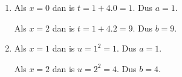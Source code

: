 \documentclass{article}
\begin{document}
\begin{enumerate}
\item
Als $x=0$ dan is $t=1+4.0=1$. Dus $a=1$.

\noindent Als $x=2$ dan is $t=1+4.2=9$. Dus $b=9$.

\item
Als $x=1$ dan is $u=1^2=1$. Dus $a=1$.

\noindent Als $x=2$ dan is $u=2^2=4$. Dus $b=4$.


\end{enumerate}
\end{document}
